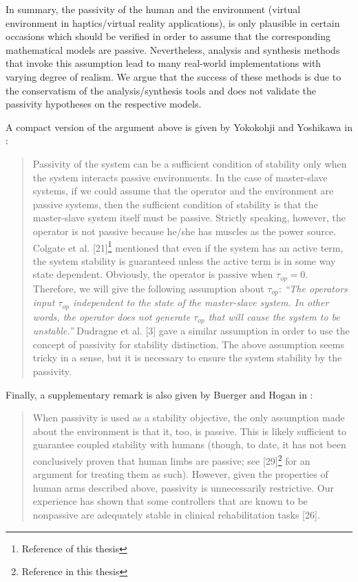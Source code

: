 In summary, the passivity of the human and the environment (virtual environment in haptics/virtual reality applications), is 
only plausible in certain occasions which should be verified in order to assume that the corresponding mathematical models 
are passive. Nevertheless, analysis and synthesis methods that invoke this assumption lead to many real-world implementations 
with varying degree of realism. We argue that the success of these methods is due to the conservatism of the analysis/synthesis tools
and does not validate the passivity hypotheses on the respective models.

A compact version of the argument above is given by Yokokohji and Yoshikawa in \cite{yokokohjiyoshikawa}: 
\begin{quote}
Passivity of the system can be a
sufficient condition of stability only when the system interacts
passive environments. In the case of master-slave systems, if
we could assume that the operator and the environment are
passive systems, then the sufficient condition of stability is
that the master-slave system itself must be passive. Strictly
speaking, however, the operator is not passive because he/she
has muscles as the power source. Colgate et al. [21]\footnote{Reference 
\cite{colgatehogan88} of this thesis} mentioned
that even if the system has an active term, the system stability
is guaranteed unless the active term is in some way state dependent.
Obviously, the operator is passive when $\tau_{op}= 0$.
Therefore, we will give the following assumption about $\tau_{op}$:
\emph{``The operators input $\tau_{op}$ independent to the state of the
master-slave system. In other words, the operator does not
generate $\tau_{op}$ that will cause the system to be unstable.''}
Dudragne et al. [3] gave a similar assumption in order to use
the concept of passivity for stability distinction. The above
assumption seems tricky in a sense, but it is necessary to ensure
the system stability by the passivity.
\end{quote}

\noindent Finally, a supplementary remark is also given by Buerger and Hogan in \cite{buergerhogan1}: 
\begin{quote}
When passivity is used as a stability objective, the only assumption
made about the environment is that it, too, is passive.
This is likely sufficient to guarantee coupled stability with humans
(though, to date, it has not been conclusively proven that
human limbs are passive; see [29]\footnote{Reference \cite{hogan89} in this thesis} for an argument for treating
them as such). However, given the properties of human arms
described above, passivity is unnecessarily restrictive. Our experience
has shown that some controllers that are known to be
nonpassive are adequately stable in clinical rehabilitation tasks [26].
\end{quote}



